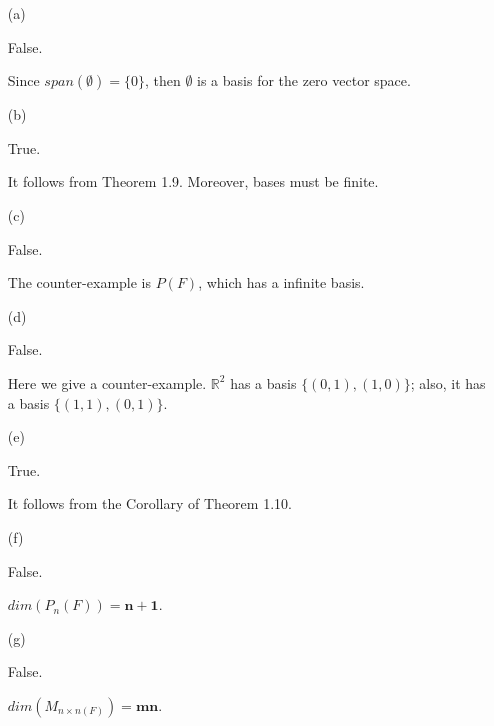 \begin{Exercise}
\begin{enumerate}[(a)]
\item[(a)]
\begin{answer}
False.
\end{answer}
\begin{solution}
Since $span(\emptyset)=\{0\}$, then $\emptyset$ is a basis for the zero vector space.
\end{solution}

\item[(b)]
\begin{answer}
True.
\end{answer}
\begin{solution}
It follows from Theorem 1.9. Moreover, bases must be finite.
\end{solution}

\item[(c)]
\begin{answer}
False.
\end{answer}
\begin{solution}
The counter-example is $P(F)$, which has a infinite basis.
\end{solution}

\item[(d)]
\begin{answer}
False.
\end{answer}
\begin{solution}
Here we give a counter-example. $\mathbb{R}^2$ has a basis $\{(0,1), (1,0)\}$; also, it has a basis $\{(1,1),(0,1)\}$.
\end{solution}

\item[(e)]
\begin{answer}
True.
\end{answer}
\begin{solution}
It follows from the Corollary of Theorem 1.10.
\end{solution}

\item[(f)]
\begin{answer}
False.
\end{answer}
\begin{solution}
$dim\left(P_n(F)\right) = \mathbf{n+1}$.
\end{solution}

\item[(g)]
\begin{answer}
False.
\end{answer}
\begin{solution}
$dim\left(M_{n\times n(F)}\right) = \mathbf{m n}$.
\end{solution}


\end{enumerate}
\end{Exercise}
